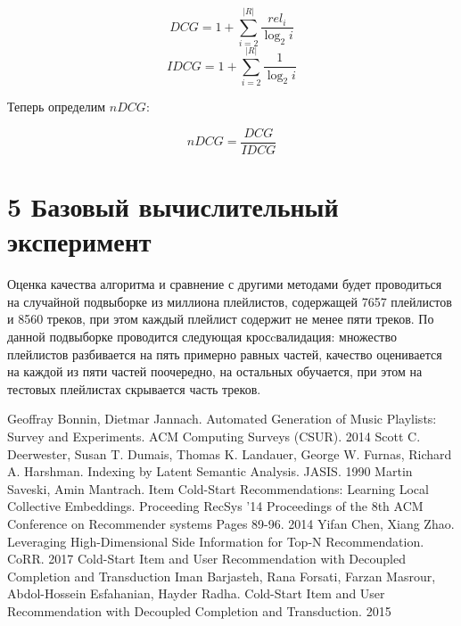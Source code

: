 \documentclass[12pt,twoside]{article}
\begin{document}
$$DCG = 1 + \sum_{i = 2}^{|R|} \frac{rel_i}{\log_{2}i}$$
$$IDCG = 1 + \sum_{i = 2}^{|R|} \frac{1}{\log_{2}i}$$

Теперь определим $nDCG$:

$$nDCG = \frac{DCG}{IDCG}$$

\section{5 Базовый вычислительный эксперимент}

Оценка качества алгоритма и сравнение с другими методами будет проводиться на случайной подвыборке из миллиона плейлистов, содержащей 7657 плейлистов и 8560 треков, при этом каждый плейлист содержит не менее пяти треков. По данной подвыборке проводится следующая кросcвалидация: множество плейлистов разбивается на пять примерно равных частей, качество оценивается на каждой из пяти частей поочередно, на остальных обучается, при этом на тестовых плейлистах скрывается часть треков.

  

\begin{thebibliography}{4}
 Geoffray Bonnin,  	Dietmar Jannach. Automated Generation of Music Playlists: Survey and Experiments. ACM Computing Surveys (CSUR). 2014
Scott C. Deerwester, Susan T. Dumais, Thomas K. Landauer, George W. Furnas, Richard A. Harshman. Indexing by Latent Semantic Analysis. JASIS. 1990
Martin Saveski, Amin Mantrach. Item Cold-Start Recommendations:
Learning Local Collective Embeddings. Proceeding
RecSys '14 Proceedings of the 8th ACM Conference on Recommender systems
Pages 89-96. 2014
Yifan Chen, Xiang Zhao. Leveraging High-Dimensional Side Information for Top-N Recommendation. CoRR. 2017
Cold-Start Item and User Recommendation with Decoupled Completion and Transduction
Iman Barjasteh, Rana Forsati, Farzan Masrour, Abdol-Hossein Esfahanian, Hayder Radha. Cold-Start Item and User Recommendation with Decoupled Completion and Transduction. 2015
\end{thebibliography}
\end{document}
